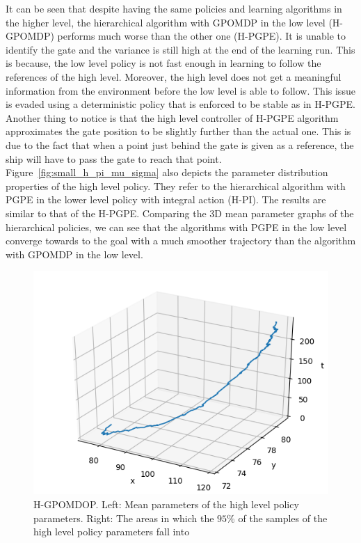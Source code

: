 It can be seen that despite having the same policies and learning algorithms in the higher level, the hierarchical algorithm with GPOMDP in the low level (H-GPOMDP) performs much worse than the other one (H-PGPE). It is unable to identify the gate and the variance is still high at the end of the learning run. This is because, the low level policy is not fast enough in learning to follow the references of the high level. Moreover, the high level does not get a meaningful information from the environment before the low level is able to follow. This issue is evaded using a deterministic policy that is enforced to be stable as in H-PGPE. Another thing to notice is that the high level controller of H-PGPE algorithm approximates the gate position to be slightly further than the actual one. This is due to the fact that when a point just behind the gate is given as a reference, the ship will have to pass the gate to reach that point. Figure~\ref{fig:small_h_pi_mu_sigma} also depicts the parameter distribution properties of the high level policy. They refer to the hierarchical algorithm with PGPE in the lower level policy with integral action (H-PI). The results are similar to that of the H-PGPE. Comparing the 3D mean parameter graphs of the hierarchical policies, we can see that the algorithms with PGPE in the low level converge towards to the goal with a much smoother trajectory than the algorithm with GPOMDP in the low level.   

\begin{figure}[b!]
	\centering
    \begin{minipage}{0.55\textwidth}
		\includegraphics[width=\textwidth]{plots/small/H-GPOMDP-mu.png}
    \end{minipage}
    \vspace{0.5cm}
    \begin{minipage}{0.44\textwidth}
    	\setlength\figureheight{5cm}  
		\setlength\figurewidth{5cm}
		
    \end{minipage}
    \caption[H-GPOMDP mean value and variance in small environment]{H-GPOMDOP. Left: Mean parameters of the high level policy parameters. Right: The areas in which the $95\%$ of the samples of the high level policy parameters fall into}
    \label{fig:small_h_gpomdp_mu_sigma}
\end{figure}
 
